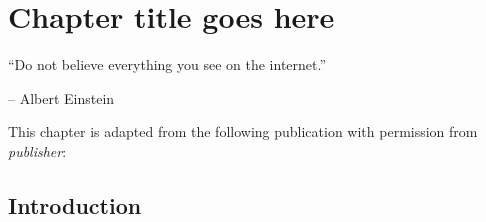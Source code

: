 \chapter{Chapter title goes here} \label{chap:chap-2}



\epigraph{\enquote{Do not believe everything you see on the internet.}}{-- Albert Einstein}



This chapter is adapted from the following publication with permission from \emph{publisher}: 
\begin{spacing}{\FullCiteSpacing}
\end{spacing}


\section{Introduction}
\Blindtext[3]


